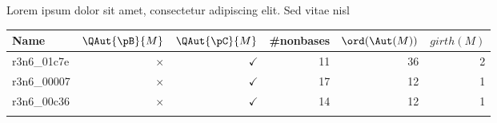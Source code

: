 \begin{center}
\end{center}
Lorem ipsum dolor sit amet, consectetur adipiscing elit. Sed vitae nisl


\begin{center}
\small
\begin{longtable}{|l|r|r|r|r|r|}
 \hline  
  \textbf{Name} & \textbf{$\QAut{\pB}{M}$} & \textbf{$\QAut{\pC}{M}$} & \textbf{#nonbases} & \textbf{$\ord(\Aut(M))$} & \textbf{$girth(M)$} \\ \hline
  r3n6\_01c7e & $\times$ & $\checkmark$ & 11 & 36 & 2 \\ \hline
  r3n6\_00007 & $\times$ & $\checkmark$ & 17 & 12 & 1 \\ \hline
  r3n6\_00c36 & $\times$ & $\checkmark$ & 14 & 12 & 1 \\ \hline
\label{Tab:computational-results-3}
\end{longtable}

\end{center}

